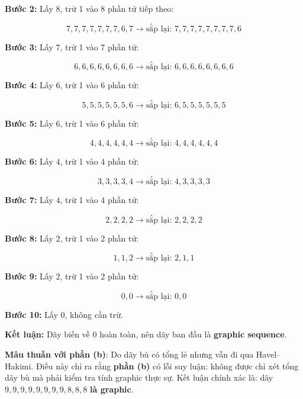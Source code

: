 \documentclass{article}
\begin{document}
	\textbf{Bước 2:} Lấy $8$, trừ 1 vào 8 phần tử tiếp theo:
	
	\[
	7,7,7,7,7,7,7,6,7 \to \text{sắp lại: } 7,7,7,7,7,7,7,7,6
	\]
	
	\textbf{Bước 3:} Lấy $7$, trừ 1 vào 7 phần tử:
	
	\[
	6,6,6,6,6,6,6,6 \to \text{sắp lại: } 6,6,6,6,6,6,6,6
	\]
	
	\textbf{Bước 4:} Lấy $6$, trừ 1 vào 6 phần tử:
	
	\[
	5,5,5,5,5,5,6 \to \text{sắp lại: } 6,5,5,5,5,5,5
	\]
	
	\textbf{Bước 5:} Lấy $6$, trừ 1 vào 6 phần tử:
	
	\[
	4,4,4,4,4,4 \to \text{sắp lại: } 4,4,4,4,4,4
	\]
	
	\textbf{Bước 6:} Lấy $4$, trừ 1 vào 4 phần tử:
	
	\[
	3,3,3,3,4 \to \text{sắp lại: } 4,3,3,3,3
	\]
	
	\textbf{Bước 7:} Lấy $4$, trừ 1 vào 4 phần tử:
	
	\[
	2,2,2,2 \to \text{sắp lại: } 2,2,2,2
	\]
	
	\textbf{Bước 8:} Lấy $2$, trừ 1 vào 2 phần tử:
	
	\[
	1,1,2 \to \text{sắp lại: } 2,1,1
	\]
	
	\textbf{Bước 9:} Lấy $2$, trừ 1 vào 2 phần tử:
	
	\[
	0,0 \to \text{sắp lại: } 0,0
	\]
	
	\textbf{Bước 10:} Lấy $0$, không cần trừ.
	
	\textbf{Kết luận:} Dãy biến về 0 hoàn toàn, nên dãy ban đầu là \textbf{graphic sequence}.
	
	\textbf{Mâu thuẫn với phần (b)}: Do dãy bù có tổng lẻ nhưng vẫn đi qua Havel–Hakimi. Điều này chỉ ra rằng \textbf{phần (b)} có lỗi suy luận: không được chỉ xét tổng dãy bù mà phải kiểm tra tính graphic thực sự. Kết luận chính xác là: dãy $9,9,9,9,9,9,9,9,8,8,8$ \textbf{là graphic}.
	
\end{document}
